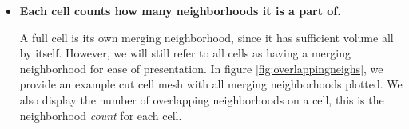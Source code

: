 \begin{itemize}

\item
{\bf Each cell counts how many neighborhoods it is a part of.}

\vspace*{.1in}
A full cell is its own merging neighborhood, since it has sufficient
volume all by itself. However, we will still refer to all cells as having a
merging neighborhood for ease of presentation.  In figure \ref{fig:overlappingneighs}, we provide an example cut cell mesh with all merging neighborhoods plotted.  We also display the number of overlapping neighborhoods on a cell, this is the neighborhood {\em count} for each cell.
\begin{figure}
	\hfill

\end{figure}
\end{itemize}
